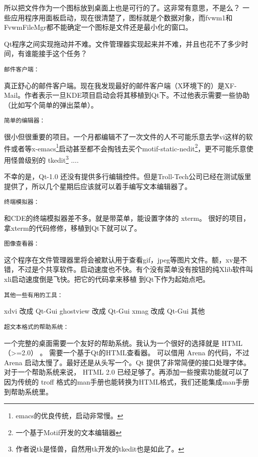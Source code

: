 \begin{insertnote}
{    所以把文件作为一个图标放到桌面上也是可行的了。这非常有意思，不是么？ 一些应用程序用面板启动，现在很清楚了，图标就是个数据对象，而fvwm1和 FvwmFileMgr都不能确定一个图标是文件还是最小化的窗口。    

    Qt程序之间实现拖动并不难。文件管理器实现起来并不难，并且也花不了多少时间，有谁能接手这个任务？
    
{ \noindent \tt 邮件客户端：}

    真正舒心的邮件客户端。现在我发现最好的邮件客户端（X环境下的）是XF-Mail。作者表示一旦KDE项目启动会将其移植到Qt下。不过他表示需要一些协助（比如写个简单的弹出菜单）。 
   
{ \noindent \tt 简单的编辑器：}

    很小但很重要的项目。一个月都编辑不了一次文件的人不可能乐意去学vi这样的软件或者等x-emacs\footnote{emacs的优良传统，启动非常慢。}启动甚至都不会掏钱去买个motif-static-nedit\footnote{一个基于Motif开发的文本编辑器}，更不可能乐意使用怪兽级别的 tkedit\footnote{作者说tk是怪兽，自然用tk开发的tkedit也是如此了。} ....

	不幸的是，Qt-1.0 还没有提供多行编辑控件。但是Troll-Tech公司已经在测试版里提供了，所以几个星期后应该就可以着手编写文本编辑器了。
	
{ \noindent \tt 终端模拟器：}

    和CDE的终端模拟器差不多。就是带菜单，能设置字体的 xterm。 很好的项目，拿xterm的代码修修，移植到Qt下就可以了。
    
{ \noindent \tt 图像查看器：}

    这个程序在文件管理器里将会被默认用于查看gif，jpeg等图片文件。额，xv是不错，不过是个共享软件。启动速度也不快。有个没有菜单没有按钮的纯Xlib软件叫xli启动速度倒是飞快。把它的代码拿来移植
    到Qt下作为起始点吧。 %
    
    
{ \noindent \tt 其他一些有用的工具：}

        xdvi 改成 Qt-Gui
        ghostview 改成 Qt-Gui
        xmag 改成 Qt-Gui
        其他

{ \noindent \tt 超文本格式的帮助系统：}

    一个完整的桌面需要一个友好的帮助系统。我认为一个很好的选择就是 HTML （>=2.0） 。 需要一个基于Qt的HTML查看器。
    可以借用 Arena 的代码，不过Arena 启动太慢了。最好还是从头写一个。Qt 提供了非常简便的接口处理字体。对于一个帮助系统来说， HTML 2.0 已经足够了。再添加一些搜索功能就可以了
    因为传统的 troff 格式的man手册也能转换为HTML格式，我们还能集成man手册到帮助系统里。

}
\end{insertnote}
